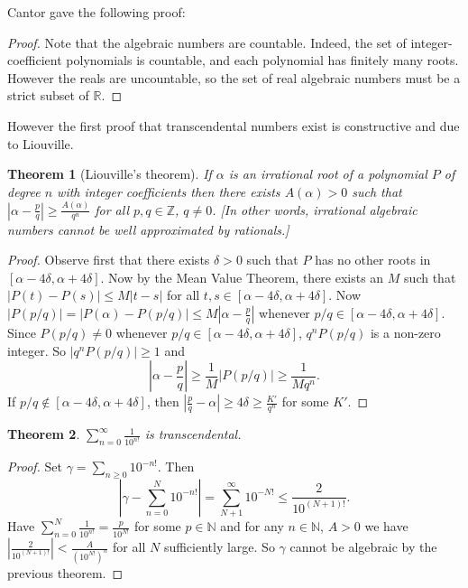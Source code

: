 \documentclass[a4paper, 10pt, twocolumn]{amsart}
\newtheorem*{theorem}{Theorem}
\theoremstyle{definition}
\newcommand{\bb}[1]{\mathbb{#1}}
\newcommand{\1}{\mathbbm{1}}
\begin{document}
Cantor gave the following proof:
\begin{proof}
    Note that the algebraic numbers are countable. Indeed, the set of integer-coefficient polynomials is countable, and each polynomial has finitely many roots. However the reals are uncountable, so the set of real algebraic numbers must be a strict subset of $\bb{R}$. 
\end{proof}

However the first proof that transcendental numbers exist is constructive and due to Liouville. 

\begin{theorem}[Liouville's theorem]
    If $\alpha$ is an irrational root of a polynomial $P$ of degree $n$ with integer coefficients then there exists $A(\alpha)>0$ such that $\left|\alpha-\frac{p}{q}\right| \ge \frac{A(\alpha)}{q^n}$ for all $p,q \in \bb{Z}$, $q\ne 0$. [In other words, irrational algebraic numbers cannot be well approximated by rationals.] 
\end{theorem}

\begin{proof}
    Observe first that there exists $\delta>0$ such that $P$ has no other roots in $[\alpha-4\delta,\alpha+4\delta]$. Now by the Mean Value Theorem, there exists an $M$ such that $|P(t)-P(s)| \le M|t-s|$ for all $t,s \in [\alpha-4\delta,\alpha+4\delta]$. Now $|P(p/q)| = |P(\alpha)-P(p/q)| \le M\left|\alpha-\frac{p}{q}\right| $ whenever $p/q \in [\alpha-4\delta,\alpha+4\delta]$. Since $P(p/q) \ne 0$ whenever $p/q  \in [\alpha-4\delta,\alpha+4\delta]$, $q^n P(p/q)$ is a non-zero integer. So $|q^n P(p/q)| \ge 1$ and \[\left|\alpha-\frac{p}{q}\right| \ge \frac{1}{M} |P(p/q)| \ge \frac{1}{Mq^n}.\]
    If $p/q  \not\in [\alpha-4\delta,\alpha+4\delta]$, then $\left|\frac{p}{q}-\alpha\right| \ge 4\delta\ge \frac{K'}{q^n}$ for some $K'$.
\end{proof}

\begin{theorem}
    $\sum_{n=0}^\infty \frac{1}{10^{n!}}$ is transcendental.
\end{theorem}

\begin{proof}
    Set $\gamma = \sum_{n\ge 0} 10^{-n!}$. Then \[\left|\gamma-\sum_{n=0}^N 10^{-n!} \right| = \sum_{N+1}^\infty 10^{-N!} \le \frac{2}{10^{(N+1)!}}.\]
    Have $\sum_{n=0}^N \frac{1}{10^{n!}} = \frac{p}{10^{N!}}$ for some $p \in \bb{N}$ and for any $n\in \bb{N}$, $A>0$ we have $\left|\frac{2}{10^{(N+1)!}}\right|< \frac{A}{(10^{N!})^n}$ for all $N$ sufficiently large. So $\gamma$ cannot be algebraic by the previous theorem.
\end{proof}
\end{document}

